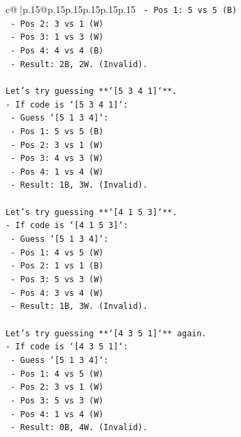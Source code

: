\documentclass{article}
\begin{document}
{\begin{supertabular}{c@{$\;$}|p{.15\linewidth}@{}p{.15\linewidth}p{.15\linewidth}p{.15\linewidth}p{.15\linewidth}p{.15\linewidth}}
{{{\texttt{        {-} Pos 1: 5 vs 5 (B)} \\
\texttt{        {-} Pos 2: 3 vs 1 (W)} \\
\texttt{        {-} Pos 3: 1 vs 3 (W)} \\
\texttt{        {-} Pos 4: 4 vs 4 (B)} \\
\texttt{        {-} Result: 2B, 2W. (Invalid).} \\
\\ 
\texttt{Let's try guessing **`{[}5 3 4 1{]}`**.} \\
\texttt{{-} If code is `{[}5 3 4 1{]}`:} \\
\texttt{    {-} Guess `{[}5 1 3 4{]}`:} \\
\texttt{        {-} Pos 1: 5 vs 5 (B)} \\
\texttt{        {-} Pos 2: 3 vs 1 (W)} \\
\texttt{        {-} Pos 3: 4 vs 3 (W)} \\
\texttt{        {-} Pos 4: 1 vs 4 (W)} \\
\texttt{        {-} Result: 1B, 3W. (Invalid).} \\
\\ 
\texttt{Let's try guessing **`{[}4 1 5 3{]}`**.} \\
\texttt{{-} If code is `{[}4 1 5 3{]}`:} \\
\texttt{    {-} Guess `{[}5 1 3 4{]}`:} \\
\texttt{        {-} Pos 1: 4 vs 5 (W)} \\
\texttt{        {-} Pos 2: 1 vs 1 (B)} \\
\texttt{        {-} Pos 3: 5 vs 3 (W)} \\
\texttt{        {-} Pos 4: 3 vs 4 (W)} \\
\texttt{        {-} Result: 1B, 3W. (Invalid).} \\
\\ 
\texttt{Let's try guessing **`{[}4 3 5 1{]}`** again.} \\
\texttt{{-} If code is `{[}4 3 5 1{]}`:} \\
\texttt{    {-} Guess `{[}5 1 3 4{]}`:} \\
\texttt{        {-} Pos 1: 4 vs 5 (W)} \\
\texttt{        {-} Pos 2: 3 vs 1 (W)} \\
\texttt{        {-} Pos 3: 5 vs 3 (W)} \\
\texttt{        {-} Pos 4: 1 vs 4 (W)} \\
\texttt{        {-} Result: 0B, 4W. (Invalid).} \\
\\ 
}}}
\end{supertabular}}
\end{document}
